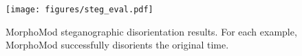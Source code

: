 \begin{figure}[t]
    \centering
    \texttt{[image: figures/steg\_eval.pdf]}
    \caption{MorphoMod steganographic disorientation results. For each example, MorphoMod successfully disorients the original time.}
    \label{fig:steg_eval}
\end{figure}